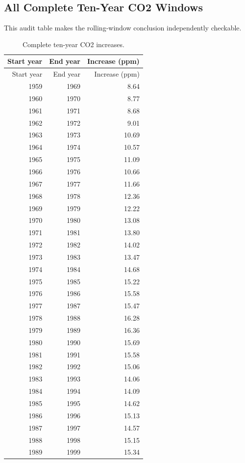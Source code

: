 \documentclass{mcmthesis}
\begin{document}
\begin{appendices}
\section{All Complete Ten-Year CO2 Windows}
This audit table makes the rolling-window conclusion independently checkable.
\begin{longtable}{rrr}
\caption{Complete ten-year CO2 increases.}\\
\toprule Start year & End year & Increase (ppm) \\ \midrule
\endfirsthead
\toprule Start year & End year & Increase (ppm) \\ \midrule
\endhead
1959 & 1969 & 8.64 \\
1960 & 1970 & 8.77 \\
1961 & 1971 & 8.68 \\
1962 & 1972 & 9.01 \\
1963 & 1973 & 10.69 \\
1964 & 1974 & 10.57 \\
1965 & 1975 & 11.09 \\
1966 & 1976 & 10.66 \\
1967 & 1977 & 11.66 \\
1968 & 1978 & 12.36 \\
1969 & 1979 & 12.22 \\
1970 & 1980 & 13.08 \\
1971 & 1981 & 13.80 \\
1972 & 1982 & 14.02 \\
1973 & 1983 & 13.47 \\
1974 & 1984 & 14.68 \\
1975 & 1985 & 15.22 \\
1976 & 1986 & 15.58 \\
1977 & 1987 & 15.47 \\
1978 & 1988 & 16.28 \\
1979 & 1989 & 16.36 \\
1980 & 1990 & 15.69 \\
1981 & 1991 & 15.58 \\
1982 & 1992 & 15.06 \\
1983 & 1993 & 14.06 \\
1984 & 1994 & 14.09 \\
1985 & 1995 & 14.62 \\
1986 & 1996 & 15.13 \\
1987 & 1997 & 14.57 \\
1988 & 1998 & 15.15 \\
1989 & 1999 & 15.34 \\

\end{longtable}
\end{appendices}
\end{document}
